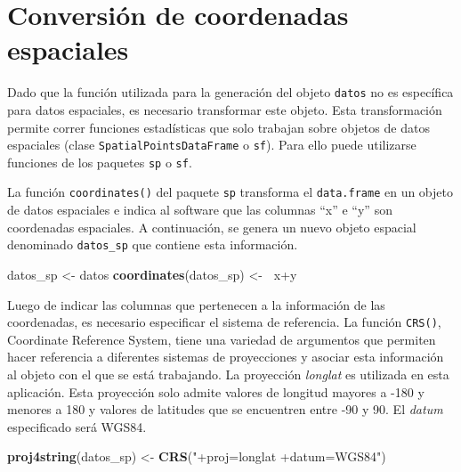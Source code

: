 \documentclass[11pt,b5paper,]{krantz}
\newenvironment{Shaded}{}{}
\newcommand{\ErrorTok}[1]{\textcolor[rgb]{1.00,0.00,0.00}{\textbf{#1}}}
\newcommand{\KeywordTok}[1]{\textcolor[rgb]{0.00,0.44,0.13}{\textbf{#1}}}
\newcommand{\NormalTok}[1]{#1}
\newcommand{\OperatorTok}[1]{\textcolor[rgb]{0.40,0.40,0.40}{#1}}
\newcommand{\StringTok}[1]{\textcolor[rgb]{0.25,0.44,0.63}{#1}}
\begin{document}
\hypertarget{conversiuxf3n-de-coordenadas-espaciales}{%
\section{Conversión de coordenadas espaciales}\label{conversiuxf3n-de-coordenadas-espaciales}}

Dado que la función utilizada para la generación del objeto \texttt{datos} no es específica para datos espaciales, es necesario transformar este objeto. Esta transformación permite correr funciones estadísticas que solo trabajan sobre objetos de datos espaciales (clase \texttt{SpatialPointsDataFrame} o \texttt{sf}). Para ello puede utilizarse funciones de los paquetes \texttt{sp} o \texttt{sf}.

La función \texttt{coordinates()} del paquete \texttt{sp} transforma el \texttt{data.frame} en un objeto de datos espaciales e indica al software que las columnas ``x'' e ``y'' son coordenadas espaciales. A continuación, se genera un nuevo objeto espacial denominado \texttt{datos\_sp} que contiene esta información.

\begin{Shaded}
\begin{Highlighting}[]
\NormalTok{datos_sp <-}\StringTok{ }\NormalTok{datos}
\KeywordTok{coordinates}\NormalTok{(datos_sp) <-}\StringTok{ }\ErrorTok{~}\NormalTok{x}\OperatorTok{+}\NormalTok{y}
\end{Highlighting}
\end{Shaded}

Luego de indicar las columnas que pertenecen a la información de las coordenadas, es necesario especificar el sistema de referencia. La función \texttt{CRS()}, Coordinate Reference System, tiene una variedad de argumentos que permiten hacer referencia a diferentes sistemas de proyecciones y asociar esta información al objeto con el que se está trabajando. La proyección \emph{longlat} es utilizada en esta aplicación. Esta proyección solo admite valores de longitud mayores a -180 y menores a 180 y valores de latitudes que se encuentren entre -90 y 90. El \emph{datum} especificado será WGS84.

\begin{Shaded}
\begin{Highlighting}[]
\KeywordTok{proj4string}\NormalTok{(datos_sp) <-}\StringTok{ }
\StringTok{  }\KeywordTok{CRS}\NormalTok{(}\StringTok{"+proj=longlat +datum=WGS84"}\NormalTok{)}
\end{Highlighting}
\end{Shaded}
\end{document}
